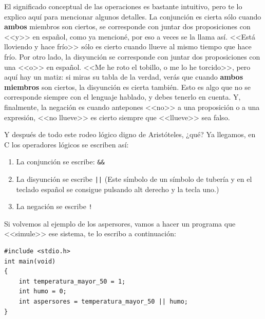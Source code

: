 \documentclass[a4paper]{article}
\begin{document}
El significado conceptual de las operaciones es bastante intuitivo, pero te lo
explico aquí para mencionar algunos detalles. La conjunción es cierta sólo
cuando \textbf{ambos} miembros son ciertos, se corresponde con juntar
dos proposiciones con <<y>> en español, como ya mencioné, por eso a veces se la
llama así. <<Está lloviendo y hace frío>> sólo es cierto cuando llueve al mismo
tiempo que hace frío. Por otro lado, la disyunción se corresponde con juntar
dos proposiciones con una <<o>> en español. <<Me he roto el tobillo, o me lo
he torcido>>, pero aquí hay un matiz: si miras su tabla de la verdad, verás que
cuando \textbf{ambos miembros} son ciertos, la disyunción es cierta también.
Esto es algo que no se corresponde siempre con el lenguaje hablado, y debes
tenerlo en cuenta. Y, finalmente, la negación es cuando antepones <<no>> a una
proposición o a una expresión, <<no llueve>> es cierto siempre que <<llueve>>
sea falso.

Y después de todo este rodeo lógico digno de Aristóteles, ¿qué? Ya llegamos,
en C los operadores lógicos se escriben así:
\begin{enumerate}
\item La conjunción se escribe: \verb!&&!
\item La disyunción se escribe \verb!||! (Este símbolo de un símbolo de tubería
y en el teclado español se consigue pulsando alt derecho y la tecla uno.)
\item La negación se escribe \verb"!"
\end{enumerate}

Si volvemos al ejemplo de los aspersores, vamos a hacer un programa que
<<simule>> ese sistema, te lo escribo a continuación:


\noindent
\begin{minipage}[H]{\linewidth}
\mbox{}
\begin{lstlisting}[style=C,
caption={Primer programa con operacioneslógicas},
label={lst:firstLogicProgram}]
#include <stdio.h>
int main(void)
{
    int temperatura_mayor_50 = 1;
    int humo = 0;
    int aspersores = temperatura_mayor_50 || humo;
}
\end{lstlisting}
\end{minipage}
\end{document}

